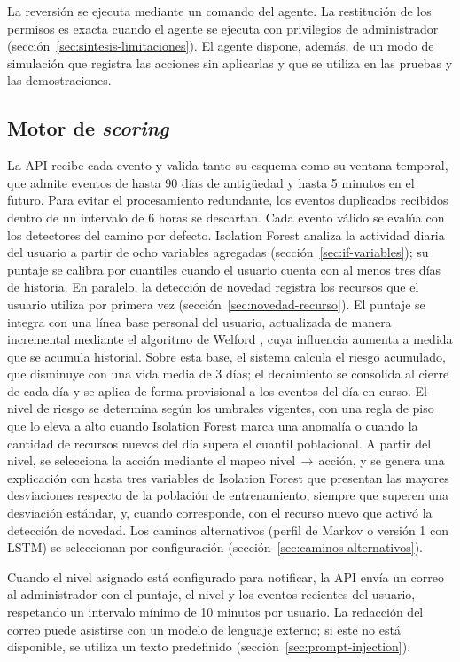 La reversión se ejecuta mediante un comando del agente. La restitución de los permisos es exacta cuando el agente se ejecuta con privilegios de administrador (sección~\ref{sec:sintesis-limitaciones}). El agente dispone, además, de un modo de simulación que registra las acciones sin aplicarlas y que se utiliza en las pruebas y las demostraciones.

\subsection{Motor de \emph{scoring}}
\label{sec:motor-scoring-producto}
La API recibe cada evento y valida tanto su esquema como su ventana temporal, que admite eventos de hasta 90 días de antigüedad y hasta 5 minutos en el futuro. Para evitar el procesamiento redundante, los eventos duplicados recibidos dentro de un intervalo de 6 horas se descartan. Cada evento válido se evalúa con los detectores del camino por defecto. Isolation Forest analiza la actividad diaria del usuario a partir de ocho variables agregadas (sección~\ref{sec:if-variables}); su puntaje se calibra por cuantiles cuando el usuario cuenta con al menos tres días de historia. En paralelo, la detección de novedad registra los recursos que el usuario utiliza por primera vez (sección~\ref{sec:novedad-recurso}). El puntaje se integra con una línea base personal del usuario, actualizada de manera incremental mediante el algoritmo de Welford \parencite*{Welford1962}, cuya influencia aumenta a medida que se acumula historial. Sobre esta base, el sistema calcula el riesgo acumulado, que disminuye con una vida media de 3 días; el decaimiento se consolida al cierre de cada día y se aplica de forma provisional a los eventos del día en curso. El nivel de riesgo se determina según los umbrales vigentes, con una regla de piso que lo eleva a alto cuando Isolation Forest marca una anomalía o cuando la cantidad de recursos nuevos del día supera el cuantil poblacional. A partir del nivel, se selecciona la acción mediante el mapeo nivel\,$\rightarrow$\,acción, y se genera una explicación con hasta tres variables de Isolation Forest que presentan las mayores desviaciones respecto de la población de entrenamiento, siempre que superen una desviación estándar, y, cuando corresponde, con el recurso nuevo que activó la detección de novedad. Los caminos alternativos (perfil de Markov o versión 1 con LSTM) se seleccionan por configuración (sección~\ref{sec:caminos-alternativos}).

Cuando el nivel asignado está configurado para notificar, la API envía un correo al administrador con el puntaje, el nivel y los eventos recientes del usuario, respetando un intervalo mínimo de 10 minutos por usuario. La redacción del correo puede asistirse con un modelo de lenguaje externo; si este no está disponible, se utiliza un texto predefinido (sección~\ref{sec:prompt-injection}).


